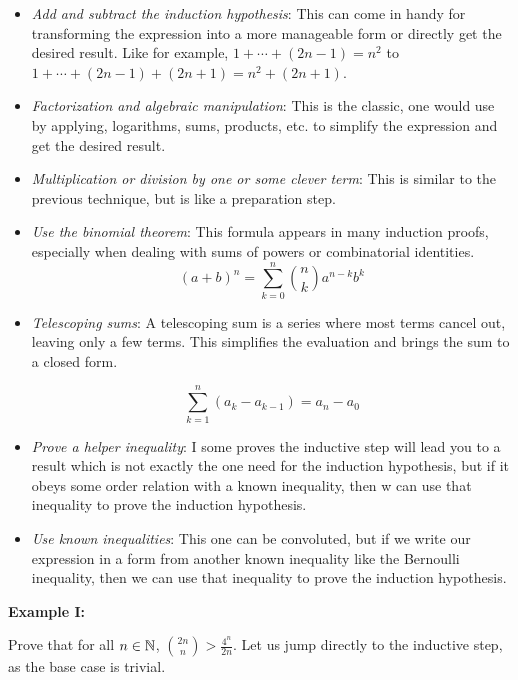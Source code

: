 \begin{itemize}

	\item \emph{Add and subtract the induction hypothesis}: This can come in handy for transforming the expression into a more manageable form or
	      directly get the desired result. Like for example, \(1 + \cdots + (2n - 1) = n^2\) to \(1 + \cdots + (2n - 1) + (2n + 1) = n^2 + (2n + 1)\).

	\item \emph{Factorization and algebraic manipulation}: This is the classic, one would use by applying, logarithms, sums, products, etc. to simplify the expression and get the desired result.

	\item \emph{Multiplication or division by one or some clever term}: This is similar to the previous technique, but is like a preparation step.

	\item \emph{Use the binomial theorem}: This formula appears in many induction proofs, especially when dealing with sums of powers or combinatorial identities.
	      \[
		      (a + b)^n = \sum_{k = 0}^{n} \binom{n}{k} a^{n-k} b^k
	      \]

	\item \emph{Telescoping sums}: A telescoping sum is a series where most terms cancel out, leaving only a few terms. This simplifies the evaluation and brings the sum to a closed form.

	      \[
		      \sum_{k = 1}^{n} (a_k - a_{k-1}) = a_n - a_0
	      \]

	\item \emph{Prove a helper inequality}: I some proves the inductive step will lead you to a result which is not exactly the one need for the induction hypothesis, but if it obeys some order relation with a
	      known inequality, then w can use that inequality to prove the induction hypothesis.

	\item \emph{Use known inequalities}: This one can be convoluted, but if we write our expression in a form from another known inequality like the Bernoulli inequality, then we can use that inequality to prove
	      the induction hypothesis.

\end{itemize}

\textbf{Example I:}

Prove that for all \(n \in \mathbb{N}\), \(\binom{2n}{n} > \frac{4^n}{2n}\). Let us jump directly to the inductive step, as the base case is trivial.

